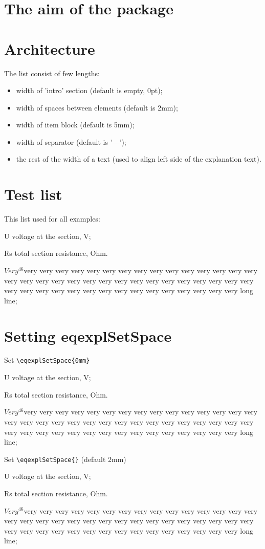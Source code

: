 \documentclass{article}
\begin{document}
\section{The aim of the package}

\section{Architecture}

The list consist of few lengths:
\begin{itemize}
\item width of 'intro' section (default is empty, 0pt);
\item width of spaces between elements (default is 2mm);
\item width of item block (default is 5mm);
\item width of separator (default is '---');
\item the rest of the width of a text (used to align left side of the
  explanation text).
\end{itemize}

\section{Test list}

\newcommand{\testList}{
\item{U} voltage at the section, V;
\item{Rs} total section resistance, Ohm.
\item{$Very^{46}$}very very very very very very very very very very very
  very very very very very very very very very very very very very
  very very very very very very very very very very very very very
  very very very very very very very very very long line;
}

This list used for all examples:
\begin{eqexpl}
  \testList
\end{eqexpl}

\section{Setting eqexplSetSpace}

Set \verb+\eqexplSetSpace{0mm}+
\eqexplSetSpace{0mm}
\begin{eqexpl}
  \testList
\end{eqexpl}

Set \verb+\eqexplSetSpace{}+ (default 2mm)
\eqexplSetSpace{}
\begin{eqexpl}
  \testList
\end{eqexpl}
\end{document}
